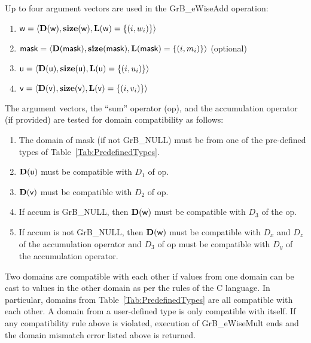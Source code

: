 Up to four argument vectors are used in the {\sf GrB\_eWiseAdd} operation:
\begin{enumerate}
	\item ${\sf w} = \langle \bold{D}({\sf w}),\bold{size}({\sf w}),\bold{L}({\sf w}) = \{(i,w_i) \} \rangle$
	\item ${\sf mask} = \langle \bold{D}({\sf mask}),\bold{size}({\sf mask}),\bold{L}({\sf mask}) = \{(i,m_i) \} \rangle$ (optional)
	\item ${\sf u} = \langle \bold{D}({\sf u}),\bold{size}({\sf u}),\bold{L}({\sf u}) = \{(i,u_i) \} \rangle$
	\item ${\sf v} = \langle \bold{D}({\sf v}),\bold{size}({\sf v}),\bold{L}({\sf v}) = \{(i,v_i) \} \rangle$
\end{enumerate}

The argument vectors, the ``sum'' operator ({\sf op}), and the accumulation 
operator (if provided) are tested for domain compatibility as follows:
\begin{enumerate}
	\item The domain of {\sf mask} (if not {\sf GrB\_NULL}) must be from one of the pre-defined types of Table~\ref{Tab:PredefinedTypes}.

	\item $\bold{D}({\sf u})$ must be compatible with $D_1$ of {\sf op}.

	\item $\bold{D}({\sf v})$ must be compatible with $D_2$ of {\sf op}.

	\item If {\sf accum} is {\sf GrB\_NULL}, then $\bold{D}({\sf w})$ must be 
    compatible with $D_3$ of the {\sf op}.

	\item If {\sf accum} is not {\sf GrB\_NULL}, then $\bold{D}({\sf w})$ must be
    compatible with $D_x$ and $D_z$ of the accumulation operator and $D_3$ of
    {\sf op} must be compatible with $D_y$ of the accumulation operator.
\end{enumerate}
Two domains are compatible with each other if values from one domain can be cast 
to values in the other domain as per the rules of the C language.
In particular, domains from Table~\ref{Tab:PredefinedTypes} are all compatible 
with each other. A domain from a user-defined type is only compatible with itself.
If any compatibility rule above is violated, execution of {\sf GrB\_eWiseMult} ends
and the domain mismatch error listed above is returned.

